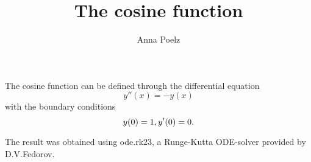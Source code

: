 \documentclass{article}
\title{The cosine function}
\author{Anna Poelz}
\begin{document}
\maketitle
The cosine function can be defined through the differential equation
\begin{equation}
	y''(x)=-y(x)
\end{equation}
with the boundary conditions
\begin{equation}
	y(0)=1,\\
	y'(0)=0.
\end{equation}

The result was obtained using ode.rk23, a Runge-Kutta ODE-solver provided by D.V.Fedorov. 

\begin{figure}[h]
	\centering
	
\end{figure}
\end{document}
